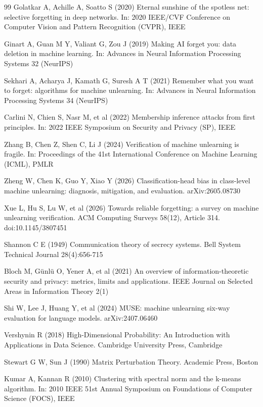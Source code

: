 \begin{thebibliography}{99}
Golatkar A, Achille A, Soatto S (2020) Eternal sunshine of the spotless net: selective forgetting in deep networks. In: 2020 IEEE/CVF Conference on Computer Vision and Pattern Recognition (CVPR), IEEE

Ginart A, Guan M Y, Valiant G, Zou J (2019) Making AI forget you: data deletion in machine learning. In: Advances in Neural Information Processing Systems 32 (NeurIPS)

Sekhari A, Acharya J, Kamath G, Suresh A T (2021) Remember what you want to forget: algorithms for machine unlearning. In: Advances in Neural Information Processing Systems 34 (NeurIPS)

Carlini N, Chien S, Nasr M, et al (2022) Membership inference attacks from first principles. In: 2022 IEEE Symposium on Security and Privacy (SP), IEEE

Zhang B, Chen Z, Shen C, Li J (2024) Verification of machine unlearning is fragile. In: Proceedings of the 41st International Conference on Machine Learning (ICML), PMLR

Zheng W, Chen K, Guo Y, Xiao Y (2026) Classification-head bias in class-level machine unlearning: diagnosis, mitigation, and evaluation. arXiv:2605.08730

Xue L, Hu S, Lu W, et al (2026) Towards reliable forgetting: a survey on machine unlearning verification. ACM Computing Surveys 58(12), Article 314. doi:10.1145/3807451

Shannon C E (1949) Communication theory of secrecy systems. Bell System Technical Journal 28(4):656-715

Bloch M, G\"unl\"u O, Yener A, et al (2021) An overview of information-theoretic security and privacy: metrics, limits and applications. IEEE Journal on Selected Areas in Information Theory 2(1)

Shi W, Lee J, Huang Y, et al (2024) MUSE: machine unlearning six-way evaluation for language models. arXiv:2407.06460

Vershynin R (2018) High-Dimensional Probability: An Introduction with Applications in Data Science. Cambridge University Press, Cambridge

Stewart G W, Sun J (1990) Matrix Perturbation Theory. Academic Press, Boston

Kumar A, Kannan R (2010) Clustering with spectral norm and the k-means algorithm. In: 2010 IEEE 51st Annual Symposium on Foundations of Computer Science (FOCS), IEEE
\end{thebibliography}
